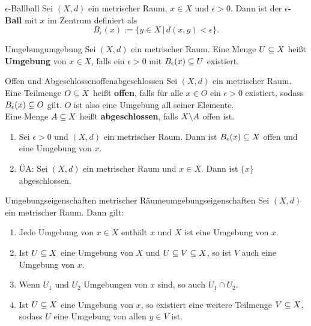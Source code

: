 \begin{definition}{$\epsilon$-Ball}{ball}
Sei $(X,d)$ ein metrischer Raum, $x \in X$ und $\epsilon > 0$. Dann ist der $\epsilon$\textbf{-Ball} mit $x$ im Zentrum definiert als 
\begin{equation}
B_\epsilon (x) := \{ y \in X \, | \, d(x,y) < \epsilon \}.
\end{equation}
\end{definition}
\begin{definition}{Umgebung}{umgebung}
Sei $(X,d)$ ein metrischer Raum. Eine Menge $U \subseteq X$ heißt \textbf{Umgebung} von $x \in X$, falls ein $\epsilon > 0$ mit $B_\epsilon (x) \subseteq U$ existiert.
\end{definition}
\begin{definition}{Offen und Abgeschlossen}{offenabgeschlossen}
Sei $(X,d)$ ein metrischer Raum. Eine Teilmenge $O \subseteq X$ heißt \textbf{offen}, falls für alle $x \in O$ ein $\epsilon > 0$ existiert, sodass $B_\epsilon (x) \subseteq O$ gilt. $O$ ist also eine Umgebung all seiner Elemente.\\
Eine Menge $A \subseteq X$ heißt \textbf{abgeschlossen}, falls $X \backslash A$ offen ist.
\end{definition}
\begin{bemerkungen}
\begin{enumerate}
\item Sei $\epsilon > 0$ und $(X,d)$ ein metrischer Raum. Dann ist $B_\epsilon (x) \subseteq X$ offen und eine Umgebung von $x$.
\item ÜA: Sei $(X,d)$ ein metrischer Raum und $x \in X$. Dann ist $\{x\}$ abgeschlossen.
\end{enumerate}
\end{bemerkungen}
\begin{satz}{Umgebungseigenschaften metrischer Räume}{umgebungseigenschaften}
Sei $(X,d)$ ein metrischer Raum. Dann gilt:
\begin{enumerate}[({U}1)]
\item Jede Umgebung von $x \in X$ enthält $x$ und $X$ ist eine Umgebung von $x$.
\item Ist $U \subseteq X$ eine Umgebung von $X$ und $U \subseteq V \subseteq X$, so ist $V$ auch eine Umgebung von $x$.
\item Wenn $U_1$ und $U_2$ Umgebungen von $x$ sind, so auch $U_1 \cap U_2$.
\item Ist $U \subseteq X$ eine Umgebung von $x$, so existiert eine weitere Teilmenge $V \subseteq X$, sodass $U$ eine Umgebung von allen $y \in V$ ist.
\end{enumerate}
\end{satz}
